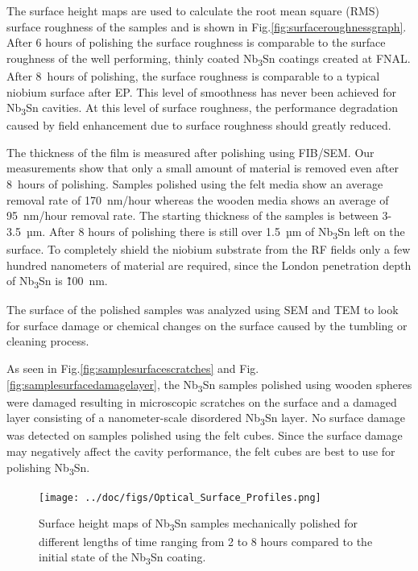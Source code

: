 \documentclass[reprint,amsmath,amssymb,aps]{revtex4-2}%
\begin{document}
The surface height maps are used to calculate the root mean square (RMS) surface roughness of the samples and is shown in Fig.\ref{fig:surfaceroughnessgraph}. After 6 hours of polishing the surface roughness is comparable to the surface roughness of the well performing, thinly coated Nb\textsubscript{3}Sn coatings created at FNAL\cite{posen2021advances}. After 8~hours of polishing, the surface roughness is comparable to a typical niobium surface after EP. This level of smoothness has never been achieved for Nb\textsubscript{3}Sn cavities. At this level of surface roughness, the performance degradation caused by field enhancement due to surface roughness should greatly reduced.

The thickness of the film is measured after polishing using FIB/SEM. Our measurements show that only a small amount of material is removed even after 8~hours of polishing. Samples polished using the felt media show an average removal rate of 170~nm/hour whereas the wooden media shows an average of 95~nm/hour removal rate. The starting thickness of the samples is between 3-3.5~µm. After 8 hours of polishing there is still over 1.5~µm of Nb\textsubscript{3}Sn left on the surface. To completely shield the niobium substrate from the RF fields only a few hundred nanometers of material are required, since the London penetration depth of Nb\textsubscript{3}Sn is \~100~nm\cite{liarte2017theoretical}.

The surface of the polished samples was analyzed using SEM and TEM to look for surface damage or chemical changes on the surface caused by the tumbling or cleaning process.

As seen in Fig.\ref{fig:samplesurfacescratches} and Fig.\ref{fig:samplesurfacedamagelayer}, the Nb\textsubscript{3}Sn samples polished using wooden spheres were damaged resulting in microscopic scratches on the surface and a damaged layer consisting of a nanometer-scale disordered Nb\textsubscript{3}Sn layer. No surface damage was detected on samples polished using the felt cubes. Since the surface damage may negatively affect the cavity performance, the felt cubes are best to use for polishing Nb\textsubscript{3}Sn.
%


\begin{figure}[t]%
\centering%
\texttt{[image: ../doc/figs/Optical\_Surface\_Profiles.png]}%
\caption{Surface height maps of Nb\textsubscript{3}Sn samples mechanically polished for different lengths of time ranging from 2 to 8 hours compared to the initial state of the Nb\textsubscript{3}Sn coating.}%
\label{fig:opticalsurfaceprofiles}%
\end{figure}
\end{document}
